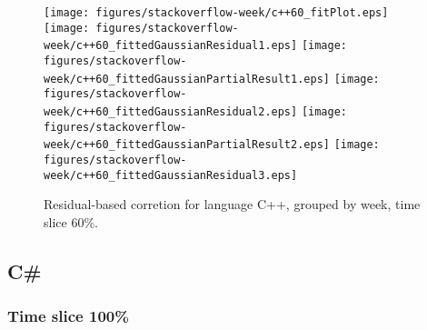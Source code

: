 \begin{figure}[hb]
\centering
{}
{\texttt{[image: figures/stackoverflow-week/c++60\_fitPlot.eps]}}
{\texttt{[image: figures/stackoverflow-week/c++60\_fittedGaussianResidual1.eps]}}
{\texttt{[image: figures/stackoverflow-week/c++60\_fittedGaussianPartialResult1.eps]}}
{\texttt{[image: figures/stackoverflow-week/c++60\_fittedGaussianResidual2.eps]}}
{\texttt{[image: figures/stackoverflow-week/c++60\_fittedGaussianPartialResult2.eps]}}
{\texttt{[image: figures/stackoverflow-week/c++60\_fittedGaussianResidual3.eps]}}
\caption{Residual-based corretion for language C++, grouped by week, time slice 60\%.}
\end{figure}


\clearpage 
\newpage 


\subsection{C\#}

\FloatBarrier

\subsubsection{Time slice 100\%}

